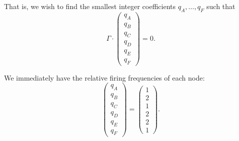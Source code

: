 \documentclass{article}
\numberwithin{equation}{section}
\numberwithin{table}{section}
\numberwithin{figure}{section}
\begin{document}
\begin{enumerate}
\begin{enumerate}
            That is, we wish to find the smallest integer coefficients $q_A,
            \ldots, q_F$ such that
            \begin{equation}
                \Gamma \cdot \begin{pmatrix}
                    q_A \\ q_B \\ q_C \\ q_D \\ q_E \\ q_F
                \end{pmatrix} = 0.
            \end{equation}

            We immediately have the relative firing frequencies of each node:
            \begin{equation}
                \begin{pmatrix}
                    q_A \\ q_B \\ q_C \\ q_D \\ q_E \\ q_F
                \end{pmatrix} =
                \begin{pmatrix}
                    1 \\ 2 \\ 1 \\ 2 \\ 2 \\ 1
                \end{pmatrix}.%
                \label{eqn:firing-freqs}
            \end{equation}


\end{enumerate}
\end{enumerate}
\end{document}
